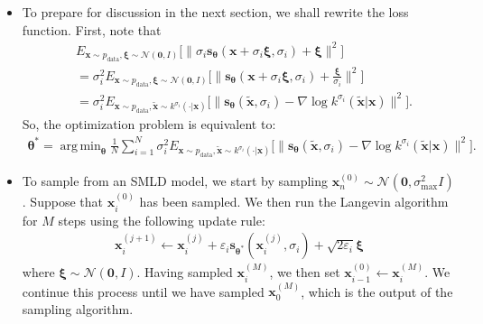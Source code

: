 \documentclass[10pt]{article}
\newcommand{\ve}[1]{\mathbf{#1}}
\newcommand{\mrm}[1]{\mathrm{#1}}
\newcommand{\ves}[1]{\boldsymbol{#1}}
\newcommand{\mcal}[1]{\mathcal{#1}}
\DeclareMathOperator*{\argmin}{arg\,min}
\begin{document}
\begin{itemize}
  \item To prepare for discussion in the next section, we shall rewrite the loss function. First, note that
  \begin{align*}  
    &E_{\ve{x}\sim p_{\mrm{data}}, \ves{\xi} \sim \mcal{N}(\ve{0},I)} \big[ \big\| \sigma_i \ve{s}_{\ves{\theta}}(\ve{x} + \sigma_i \ves{\xi},\sigma_i) + \ves{\xi} \big\|^2 \big] \\
    &= \sigma_i^2 E_{\ve{x}\sim p_{\mrm{data}}, \ves{\xi} \sim \mcal{N}(\ve{0},I)} \bigg[ \bigg\| \ve{s}_{\ves{\theta}}(\ve{x} + \sigma_i \ves{\xi},\sigma_i) + \frac{\ves{\xi}}{\sigma_i} \bigg\|^2 \bigg] \\
    &= \sigma_i^2 E_{\ve{x}\sim p_{\mrm{data}}, \widetilde{\ve{x}} \sim k^{\sigma_i}(\cdot | \ve{x})} \big[ \big\| \ve{s}_{\ves{\theta}}(\widetilde{\ve{x}},\sigma_i) - \nabla \log k^{\sigma_i}(\widetilde{\ve{x}}| \ve{x}) \big\|^2 \big].
  \end{align*}
  So, the optimization problem is equivalent to:  
  \begin{align} \label{eqn:smlg-optimization}
    \ves{\theta}^* = \argmin_{\ves{\theta}} \frac{1}{N} \sum_{i=1}^N \sigma_i^2 E_{\ve{x}\sim p_{\mrm{data}}, \widetilde{\ve{x}} \sim k^{\sigma_i}(\cdot | \ve{x})} \big[ \big\| \ve{s}_{\ves{\theta}}(\widetilde{\ve{x}},\sigma_i) - \nabla \log k^{\sigma_i}(\widetilde{\ve{x}}| \ve{x}) \big\|^2 \big].
  \end{align}

  \item To sample from an SMLD model, we start by sampling $\ve{x}_n^{(0)} \sim \mcal{N}(\ve{0}, \sigma_{\max}^2 I)$. Suppose that $\ve{x}_i^{(0)}$ has been sampled. We then run the Langevin algorithm for $M$ steps using the following update rule:
  \begin{align*}
    \ve{x}^{(j+1)}_i \gets \ve{x}^{(j)}_i + \varepsilon_i \ve{s}_{\ves{\theta}^*}(\ve{x}_i^{(j)}, \sigma_i) + \sqrt{2\varepsilon_i} \ves{\xi}
  \end{align*}
  where $\ves{\xi} \sim \mcal{N}(\ve{0},I)$. Having sampled $\ve{x}^{(M)}_i$, we then set $\ve{x}^{(0)}_{i-1} \gets \ve{x}^{(M)}_i$. We continue this process until we have sampled $\ve{x}_0^{(M)}$, which is the output of the sampling algorithm.


\end{itemize}
\end{document}
